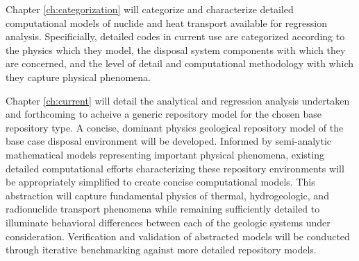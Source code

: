 Chapter \ref{ch:categorization} will categorize and characterize 
detailed computational models of nuclide and heat transport available 
for regression analysis. Specificially, detailed codes in current use 
are categorized according to the physics which they model, the 
disposal system components with which they are concerned, and the 
level of detail and computational methodology with which they capture 
physical phenomena. 

Chapter \ref{ch:current} will detail the analytical and regression 
analysis undertaken and forthcoming to acheive a generic repository model for the 
chosen base repository type. A concise, dominant physics geological 
repository model of the base case disposal environment will be 
developed. Informed by semi-analytic mathematical models representing 
important physical phenomena, existing detailed computational efforts 
characterizing these repository environments will be appropriately 
simplified to create concise computational models. This abstraction 
will capture fundamental physics of thermal, hydrogeologic, and 
radionuclide transport phenomena while remaining sufficiently detailed 
to illuminate behavioral differences between each of the geologic 
systems under consideration.  Verification and validation of 
abstracted models will be conducted through iterative benchmarking 
against more detailed repository models.

% 

